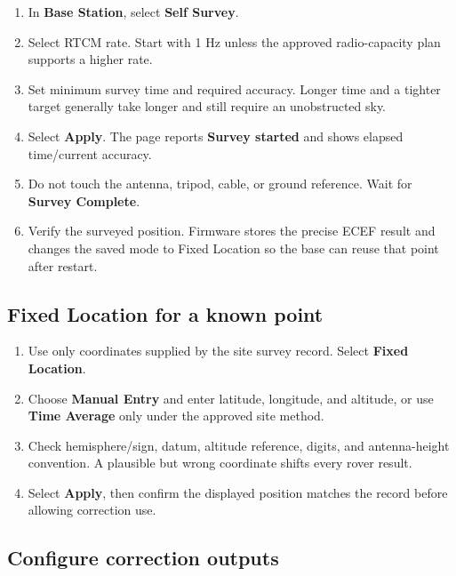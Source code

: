 \documentclass[
  10pt,
  letterpaper,
  openany]{report}
\providecommand{\tightlist}{%
  \setlength{\itemsep}{0pt}\setlength{\parskip}{0pt}}
\begin{document}
\begin{enumerate}
\tightlist
\item
  In \textbf{Base Station}, select \textbf{Self Survey}.
\item
  Select RTCM rate. Start with 1 Hz unless the approved radio-capacity
  plan supports a higher rate.
\item
  Set minimum survey time and required accuracy. Longer time and a
  tighter target generally take longer and still require an unobstructed
  sky.
\item
  Select \textbf{Apply}. The page reports \textbf{Survey started} and
  shows elapsed time/current accuracy.
\item
  Do not touch the antenna, tripod, cable, or ground reference. Wait for
  \textbf{Survey Complete}.
\item
  Verify the surveyed position. Firmware stores the precise ECEF result
  and changes the saved mode to Fixed Location so the base can reuse
  that point after restart.
\end{enumerate}

\subsection{Fixed Location for a known
point}\label{fixed-location-for-a-known-point}

\begin{enumerate}
\tightlist
\item
  Use only coordinates supplied by the site survey record. Select
  \textbf{Fixed Location}.
\item
  Choose \textbf{Manual Entry} and enter latitude, longitude, and
  altitude, or use \textbf{Time Average} only under the approved site
  method.
\item
  Check hemisphere/sign, datum, altitude reference, digits, and
  antenna-height convention. A plausible but wrong coordinate shifts
  every rover result.
\item
  Select \textbf{Apply}, then confirm the displayed position matches the
  record before allowing correction use.
\end{enumerate}

\subsection{Configure correction
outputs}\label{configure-correction-outputs}
\end{document}
